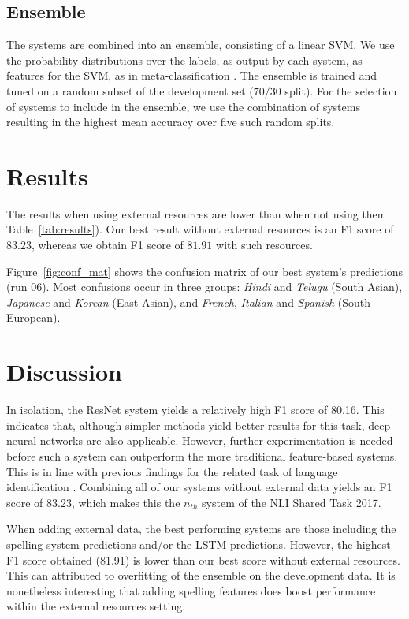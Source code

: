 \documentclass[11pt,letterpaper]{article}
\begin{document}
\subsection{Ensemble}
The systems are combined into an ensemble, consisting of a linear SVM.
We use the probability distributions over the labels, as output by each system, as features for the SVM, as in meta-classification \citep{malmasi:2017:nlisg}.
The ensemble is trained and tuned on a random subset of the development set ($70/30$ split).
For the selection of systems to include in the ensemble, we use the combination of systems resulting in the highest mean accuracy over five such random splits.


\section{Results}
The results when using external resources are lower than when not using them Table~\ref{tab:results}).
Our best result without external resources is an F1 score of $83.23$, whereas we obtain F1 score of $81.91$ with such resources.

Figure~\ref{fig:conf_mat} shows the confusion matrix of our best system's predictions (run 06).
Most confusions occur in three groups: \textit{Hindi} and \textit{Telugu} (South Asian), \textit{Japanese} and \textit{Korean} (East Asian), and \textit{French}, \textit{Italian} and \textit{Spanish} (South European).


\section{Discussion}

In isolation, the ResNet system yields a relatively high F1 score of 80.16.
This indicates that, although simpler methods yield better results for this task, deep neural networks are also applicable.
However, further experimentation is needed before such a system can outperform the more traditional feature-based systems.
This is in line with previous findings for the related task of language identification \citep{medvedeva:2017,vardial2017}.
Combining all of our systems without external data yields an F1 score of 83.23, which makes this the $n_{th}$ system of the NLI Shared Task 2017.

When adding external data, the best performing systems are those including the spelling system predictions and/or the LSTM predictions.
However, the highest F1 score obtained (81.91) is lower than our best score without external resources.
This can attributed to overfitting of the ensemble on the development data.
It is nonetheless interesting that adding spelling features does boost performance within the external resources setting.
\end{document}
